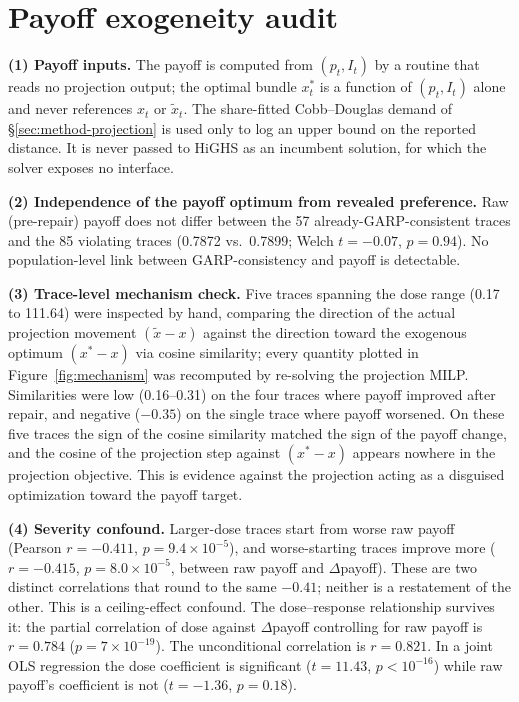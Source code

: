 \documentclass{article}
\begin{document}
\begin{ack}
\end{ack}




\appendix

\section{Payoff exogeneity audit}
\label{app:payoff-audit}

\textbf{(1) Payoff inputs.} The payoff is computed from $(p_t, I_t)$ by a routine that reads no
projection output; the optimal bundle $x^*_t$ is a function of
$(p_t, I_t)$ alone and never references $x_t$ or $\tilde{x}_t$. The share-fitted Cobb--Douglas
demand of \S\ref{sec:method-projection} is used only to log an upper bound on the reported
distance. It is never passed to HiGHS as an incumbent solution, for which the solver exposes no
interface.

\textbf{(2) Independence of the payoff optimum from revealed preference.} Raw (pre-repair) payoff
does not differ between the 57 already-GARP-consistent traces and the 85 violating traces
(0.7872 vs.\ 0.7899; Welch $t=-0.07$, $p=0.94$). No population-level link between GARP-consistency
and payoff is detectable.

\textbf{(3) Trace-level mechanism check.} Five traces spanning the dose range (0.17 to
111.64) were inspected by hand, comparing the direction of the actual projection movement
$(\tilde{x}-x)$ against the direction toward the exogenous optimum $(x^*-x)$ via cosine
similarity; every quantity plotted in Figure~\ref{fig:mechanism} was recomputed by re-solving the
projection MILP. Similarities were low (0.16--0.31) on the four traces where payoff improved after
repair, and negative ($-0.35$) on the single trace where payoff worsened. On these five traces the
sign of the cosine similarity matched the sign of the payoff change, and the cosine of the
projection step against $(x^*-x)$ appears nowhere in the projection objective. This is evidence
against the projection acting as a disguised optimization toward the payoff target.

\textbf{(4) Severity confound.} Larger-dose traces start from worse raw payoff
(Pearson $r=-0.411$, $p=9.4\times10^{-5}$), and worse-starting traces improve more
($r=-0.415$, $p=8.0\times10^{-5}$, between raw payoff and $\Delta$payoff). These are two distinct
correlations that round to the same $-0.41$; neither is a restatement of the other. This is a
ceiling-effect confound. The
dose--response relationship survives it: the partial correlation of dose against
$\Delta$payoff controlling for raw payoff is $r=0.784$ ($p=7\times10^{-19}$). The unconditional
correlation is $r=0.821$. In a joint OLS regression the dose coefficient is
significant ($t=11.43$, $p<10^{-16}$) while raw payoff's coefficient is not
($t=-1.36$, $p=0.18$).
\end{document}
